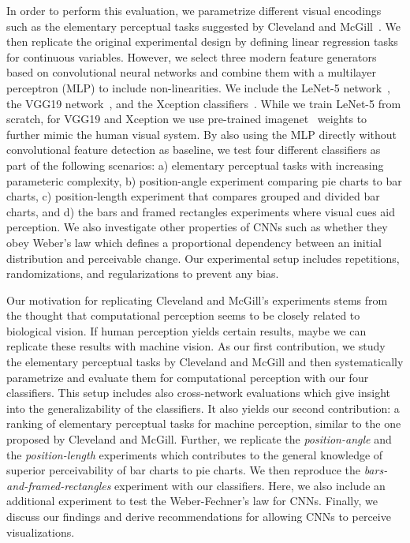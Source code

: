 In order to perform this evaluation, we parametrize different visual encodings such as the elementary perceptual tasks suggested by Cleveland and McGill~\cite{cleveland_mcgill}. We then replicate the original experimental design by defining linear regression tasks for continuous variables. However, we select three modern feature generators based on convolutional neural networks and combine them with a multilayer perceptron (MLP) to include non-linearities. We include the LeNet-5 network~\cite{lenet}, the VGG19 network~\cite{simonyan_very_deep2014}, and the Xception classifiers~\cite{xception}. While we train LeNet-5 from scratch, for VGG19 and Xception we use pre-trained imagenet~\cite{imagenet} weights to further mimic the human visual system. By also using the MLP directly without convolutional feature detection as baseline, we test four different classifiers as part of the following scenarios: a) elementary perceptual tasks with increasing parameteric complexity, b) position-angle experiment comparing pie charts to bar charts, c) position-length experiment that compares grouped and divided bar charts, and d) the bars and framed rectangles experiments where visual cues aid perception. We also investigate other properties of CNNs such as whether they obey Weber's law which defines a proportional dependency between an initial distribution and perceivable change. Our experimental setup includes repetitions, randomizations, and regularizations to prevent any bias. 

Our motivation for replicating Cleveland and McGill's experiments stems from the thought that computational perception seems to be closely related to biological vision. If human perception yields certain results, maybe we can replicate these results with machine vision. As our first contribution, we study the elementary perceptual tasks by Cleveland and McGill and then systematically parametrize and evaluate them for computational perception with our four classifiers. This setup includes also cross-network evaluations which give insight into the generalizability of the classifiers. It also yields our second contribution: a ranking of elementary perceptual tasks for machine perception, similar to the one proposed by Cleveland and McGill. Further, we replicate the \emph{position-angle} and the \emph{position-length} experiments which contributes to the general knowledge of superior perceivability of bar charts to pie charts. We then reproduce the \emph{bars-and-framed-rectangles} experiment with our classifiers. Here, we also include an additional experiment to test the Weber-Fechner's law for CNNs. Finally, we discuss our findings and derive recommendations for allowing CNNs to perceive visualizations.

